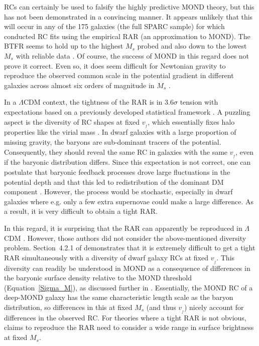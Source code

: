 \documentclass[fleqn,usenatbib,useAMS,onecolumn]{mnras} %
\begin{document}
RCs can certainly be used to falsify the highly predictive MOND theory, but this has not been demonstrated in a convincing manner. It appears unlikely that this will occur in any of the 175 galaxies (the full SPARC sample) for which \citet{Li_2018} conducted RC fits using the empirical RAR (an approximation to MOND). The BTFR seems to hold up to the highest $M_s$ probed and also down to the lowest $M_s$ with reliable data \citep{Saburova_2021}. Of course, the success of MOND in this regard does not prove it correct. Even so, it does seem difficult for Newtonian gravity to reproduce the observed common scale in the potential gradient in different galaxies across almost six orders of magnitude in $M_s$ \citep{Wu_2015}.

In a $\Lambda$CDM context, the tightness of the RAR is in $3.6\sigma$ tension with expectations \citep{Desmond_2017b} based on a previously developed statistical framework \citep{Desmond_2017a}. A puzzling aspect is the diversity of RC shapes at fixed $v_{_f}$, which essentially fixes halo properties like the virial mass \citep{Oman_2015}. In dwarf galaxies with a large proportion of missing gravity, the baryons are sub-dominant tracers of the potential. Consequently, they should reveal the same RC in galaxies with the same $v_{_f}$, even if the baryonic distribution differs. Since this expectation is not correct, one can postulate that baryonic feedback processes drove large fluctuations in the potential depth and that this led to redistribution of the dominant DM component \citep{Pontzen_2012}. However, the process would be stochastic, especially in dwarf galaxies where e.g. only a few extra supernovae could make a large difference. As a result, it is very difficult to obtain a tight RAR.

In this regard, it is surprising that the RAR can apparently be reproduced in $\Lambda$CDM \citep{Dutton_2019}. However, those authors did not consider the above-mentioned diversity problem. Section~4.2.1 of \citet{Ghari_2019_DM} demonstrates that it is extremely difficult to get a tight RAR simultaneously with a diversity of dwarf galaxy RCs at fixed $v_{_f}$. This diversity can readily be understood in MOND as a consequence of differences in the baryonic surface density relative to the MOND threshold (Equation~\ref{Sigma_M}), as discussed further in \citet{McGaugh_2020}. Essentially, the MOND RC of a deep-MOND galaxy has the same characteristic length scale as the baryon distribution, so differences in this at fixed $M_s$ (and thus $v_{_f}$) nicely account for differences in the observed RC. For theories where a tight RAR is not obvious, claims to reproduce the RAR need to consider a wide range in surface brightness at fixed $M_s$.
\end{document}
